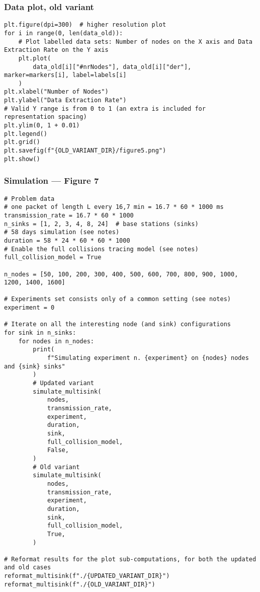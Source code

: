 \documentclass[a4paper,11pt]{article} %
\begin{document}
    \subsubsection*{Data plot, old variant}

    \begin{verbatim}
plt.figure(dpi=300)  # higher resolution plot
for i in range(0, len(data_old)):
    # Plot labelled data sets: Number of nodes on the X axis and Data Extraction Rate on the Y axis
    plt.plot(
        data_old[i]["#nrNodes"], data_old[i]["der"], marker=markers[i], label=labels[i]
    )
plt.xlabel("Number of Nodes")
plt.ylabel("Data Extraction Rate")
# Valid Y range is from 0 to 1 (an extra is included for representation spacing)
plt.ylim(0, 1 + 0.01)
plt.legend()
plt.grid()
plt.savefig(f"{OLD_VARIANT_DIR}/figure5.png")
plt.show()
    \end{verbatim}

    \subsubsection*{Simulation — Figure 7}

    \begin{verbatim}
# Problem data
# one packet of length L every 16,7 min = 16.7 * 60 * 1000 ms
transmission_rate = 16.7 * 60 * 1000
n_sinks = [1, 2, 3, 4, 8, 24]  # base stations (sinks)
# 58 days simulation (see notes)
duration = 58 * 24 * 60 * 60 * 1000
# Enable the full collisions tracing model (see notes)
full_collision_model = True

n_nodes = [50, 100, 200, 300, 400, 500, 600, 700, 800, 900, 1000, 1200, 1400, 1600]

# Experiments set consists only of a common setting (see notes)
experiment = 0

# Iterate on all the interesting node (and sink) configurations
for sink in n_sinks:
    for nodes in n_nodes:
        print(
            f"Simulating experiment n. {experiment} on {nodes} nodes and {sink} sinks"
        )
        # Updated variant
        simulate_multisink(
            nodes,
            transmission_rate,
            experiment,
            duration,
            sink,
            full_collision_model,
            False,
        )
        # Old variant
        simulate_multisink(
            nodes,
            transmission_rate,
            experiment,
            duration,
            sink,
            full_collision_model,
            True,
        )

# Reformat results for the plot sub-computations, for both the updated and old cases
reformat_multisink(f"./{UPDATED_VARIANT_DIR}")
reformat_multisink(f"./{OLD_VARIANT_DIR}")
    \end{verbatim}
\end{document}
